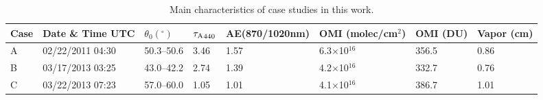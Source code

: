 \begin{table}[b]
  \centering
  \small
  \caption{Main characteristics of case studies in this work.}
  \label{tab:invcase}
  \begin{tabular}{p{2em} C{7em}  C{4em} C{2em} C{5em} C{4em} C{4em} C{2em}}
  \toprule
  Case  & Date \& Time \newline UTC& $\theta_0(^\circ)$ & ${\tau_\text{A}}_{440}$ &
  AE\newline(870/1020nm)& OMI  \newline(molec/cm$^2$) & 
  OMI  \newline (DU) & Vapor \newline (cm) \\
  \midrule
   A & 02/22/2011 04:30	& 50.3--50.6 & 3.46 & 1.57 & 6.3$\times$10$^{16}$ & 356.5 & 0.86\\
   B & 03/17/2013 03:25 & 43.0--42.2 & 2.74 & 1.39 & 4.2$\times$10$^{16}$ & 332.7 & 0.76\\
   C & 03/22/2013 07:23 & 57.0--60.0 & 1.05 & 1.01 & 4.1$\times$10$^{16}$ & 386.7 & 1.01\\
  \bottomrule
  \end{tabular}
\end{table}

